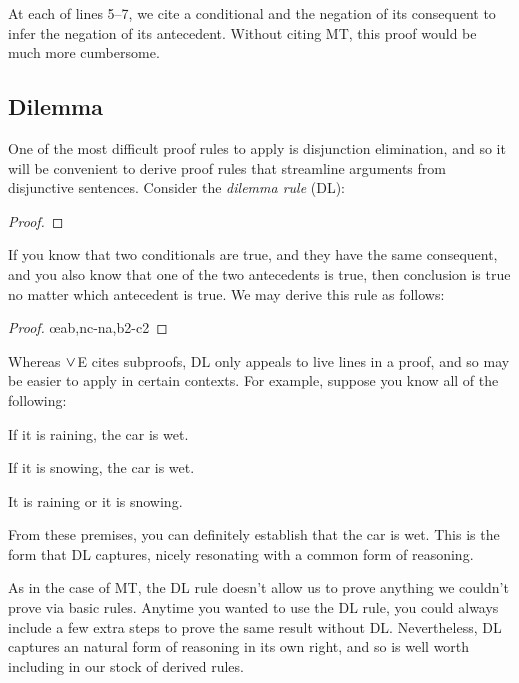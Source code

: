 At each of lines 5--7, we cite a conditional and the negation of its consequent to infer the negation of its antecedent.
Without citing MT, this proof would be much more cumbersome.


\subsection{Dilemma}

One of the most difficult proof rules to apply is disjunction elimination, and so it will be convenient to derive proof rules that streamline arguments from disjunctive sentences.
Consider the \textit{dilemma rule} (DL):

\begin{proof}
	 
\end{proof}

If you know that two conditionals are true, and they have the same consequent, and you also know that one of the two antecedents is true, then conclusion is true no matter which antecedent is true.
We may derive this rule as follows:

\begin{proof}
	\open
		\as{}
  \close
  \open
    \metaB\as{}
  \close
	 \oe{ab,nc-na,b2-c2}
\end{proof}

Whereas $\mkern1mu\vee\mkern1mu$E cites subproofs, DL only appeals to live lines in a proof, and so may be easier to apply in certain contexts.
For example, suppose you know all of the following:

\begin{earg}
\item[] If it is raining, the car is wet.
\item[] If it is snowing, the car is wet.
\item[] It is raining or it is snowing.
\end{earg}

From these premises, you can definitely establish that the car is wet.
This is the form that DL captures, nicely resonating with a common form of reasoning.

As in the case of MT, the DL rule doesn't allow us to prove anything we couldn't prove via basic rules.
Anytime you wanted to use the DL rule, you could always include a few extra steps to prove the same result without DL.
Nevertheless, DL captures an natural form of reasoning in its own right, and so is well worth including in our stock of derived rules.




